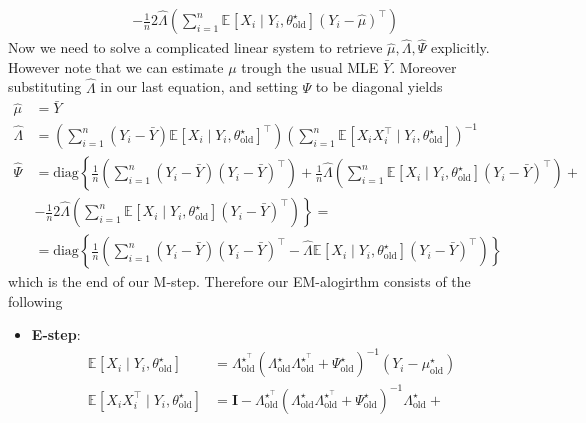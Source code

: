 \documentclass[10pt,notitlepage]{article}
\newcommand{\mean}[2][]{\mathbb{E}_{#1}\left[#2\right]}
\newcommand{\Id}{\mathbf{I}}
\begin{document}
\begin{exercise}[Solution]
\begin{align*}
            &- \frac{1}{n} 2 \hat{\Lambda} \left(\sum_{i=1}^{n}\mean{X_i\mid Y_i, \theta^\star_{\text{old}}}\left(Y_i-\hat{\mu}\right)^\top\right)
        \end{align*}
        Now we need to solve a complicated linear system to retrieve $\hat{\mu},\hat{\Lambda},\hat{\Psi}$ explicitly. \\
        However note that we can estimate $\mu$ trough the usual MLE $\bar{Y}$. Moreover substituting $\hat{\Lambda}$ in our last equation, and setting $\Psi$ to be diagonal yields
        \begin{align*}
            \hat{\mu} &= \bar{Y}\\
            \hat{\Lambda}&=\left(\sum_{i=1}^{n}\left(Y_i-\bar{Y}\right)\mean{X_i\mid Y_i, \theta^\star_{\text{old}}}^\top\right)\left(\sum_{i=1}^{n}\mean{X_i X_i^\top\mid Y_i, \theta^\star_{\text{old}}}\right)^{-1}\\
            \hat{\Psi} &= \text{diag}\left\{\frac{1}{n}\left(\sum_{i=1}^{n}\left(Y_i-\bar{Y}\right)\left(Y_i-\bar{Y}\right)^\top\right) + \frac{1}{n}\hat{\Lambda}\left(\sum_{i=1}^{n}\mean{X_i\mid Y_i, \theta^\star_{\text{old}}}\left(Y_i-\bar{Y}\right)^\top\right) +\right.\\
            &\left.-\frac{1}{n} 2 \hat{\Lambda} \left(\sum_{i=1}^{n}\mean{X_i\mid Y_i, \theta^\star_{\text{old}}}\left(Y_i-\bar{Y}\right)^\top\right) \right\}= \\
            &= \text{diag}\left\{\frac{1}{n}\left(\sum_{i=1}^{n}\left(Y_i-\bar{Y}\right)\left(Y_i-\bar{Y}\right)^\top - \hat{\Lambda}\mean{X_i\mid Y_i, \theta^\star_{\text{old}}}\left(Y_i-\bar{Y}\right)^\top\right)\right\}
        \end{align*}
        which is the end of our M-step.
        Therefore our EM-alogirthm consists of the following
        \begin{itemize}
            \item \textbf{E-step}:
                    \begin{align*}
                        \mean{X_i\mid Y_i, \theta^\star_{\text{old}}} &= \Lambda^{\star^\top}_{\text{old}}\left(\Lambda^\star_{\text{old}}\Lambda^{\star^\top}_{\text{old}}+\Psi^\star_{\text{old}}\right)^{-1}\left(Y_i-\mu^\star_{\text{old}}\right)\\
                        \mean{X_i X_i^\top\mid Y_i, \theta^\star_{\text{old}}} &= \Id-\Lambda^{\star^\top}_{\text{old}}\left(\Lambda^\star_{\text{old}}\Lambda^{\star^\top}_{\text{old}}+\Psi^\star_{\text{old}}\right)^{-1}\Lambda^\star_{\text{old}} + \\

\end{align*}
\end{itemize}
\end{exercise}
\end{document}
